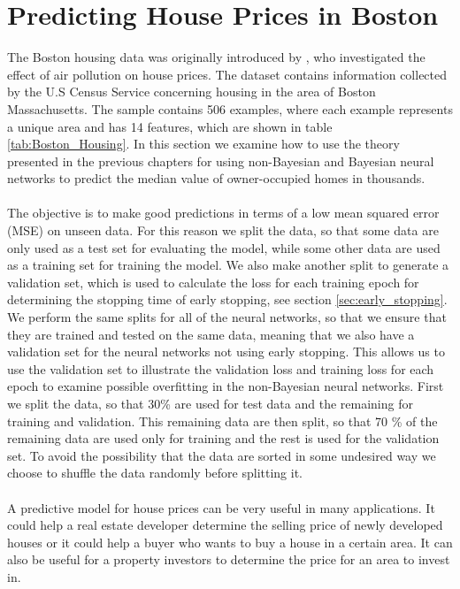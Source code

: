 \section{Predicting House Prices in Boston}\label{sec:Boston_housing}
The Boston housing data was originally introduced by \cite{HARRISON197881}, who investigated the effect of air pollution on house prices.
The dataset contains information collected by the U.S Census Service concerning housing in the area of Boston Massachusetts. The sample contains 506 examples, where each example represents a unique area and has 14 features, which are shown in table \ref{tab:Boston_Housing}. In this section we examine how to use the theory presented in the previous chapters for using non-Bayesian and Bayesian neural networks to predict the median value of owner-occupied homes in thousands.  
\\
\\
The objective is to make good predictions in terms of a low mean squared error (MSE) on unseen data. For this reason we split the data, so that some data are only used as a test set for evaluating the model, while some other data are used as a training set for training the model. We also make another split to generate a validation set, which is used to calculate the loss for each training epoch for determining the stopping time of early stopping, see section \ref{sec:early_stopping}. We perform the same splits for all of the neural networks, so that we ensure that they are trained and tested on the same data, meaning that we also have a validation set for the neural networks not using early stopping. This allows us to use the validation set to illustrate the validation loss and training loss for each epoch to examine possible overfitting in the non-Bayesian neural networks. First we split the data, so that 30\% are used for test data and the remaining for training and validation. This remaining data are then split, so that 70 \% of the remaining data are used only for training and the rest is used for the validation set. To avoid the possibility that the data are sorted in some undesired way we choose to shuffle the data randomly before splitting it. 
\\
\\
 A predictive model for house prices can be very useful in many applications. It could help a real estate developer determine the selling price of newly developed houses or it could help a buyer who wants to buy a house in a certain area. It can also be useful for a property investors to determine the price for an area to invest in.
 


